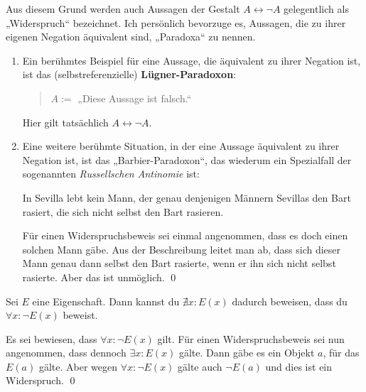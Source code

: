 \begin{bsp}[*] \label{bsp:paradox}
    Aus diesem Grund werden auch Aussagen der Gestalt $A\leftrightarrow \neg A$ gelegentlich als „Widerspruch“ bezeichnet.  Ich persönlich bevorzuge es, Aussagen, die zu ihrer eigenen Negation äquivalent sind, „Paradoxa“ zu nennen.
    \begin{enumerate}
        \item Ein berühmtes Beispiel für eine Aussage, die äquivalent zu ihrer Negation ist, ist das (selbstreferenzielle) \textbf{Lügner-Paradoxon}:
        \begin{quote}
            $A:=$ „Diese Aussage ist falsch.“
        \end{quote}
        Hier gilt tatsächlich $A\leftrightarrow \neg A$.
        \item Eine weitere berühmte Situation, in der eine Aussage äquivalent zu ihrer Negation ist, ist das „Barbier-Paradoxon“, das wiederum ein Spezialfall der sogenannten \emph{Russellschen Antinomie} ist:
        \begin{satz}
            In Sevilla lebt kein Mann, der genau denjenigen Männern Sevillas den Bart rasiert, die sich nicht selbst den Bart rasieren.
        \end{satz}
        \begin{bew}
            Für einen Widerspruchsbeweis sei einmal angenommen, dass es doch einen solchen Mann gäbe. Aus der Beschreibung leitet man ab, dass sich dieser Mann genau dann selbst den Bart rasierte, wenn er ihn sich nicht selbst rasierte. Aber das ist unmöglich. \qed
        \end{bew}
    \end{enumerate}
    
\end{bsp}

  
\begin{satz} \label{existenzwiderleg}
    Sei $E$ eine Eigenschaft. Dann kannst du $\nexists x: E(x)$ dadurch beweisen, dass du $\forall x: \neg E(x)$ beweist.
\end{satz}


\begin{bew}
    Es sei bewiesen, dass $\forall x: \neg E(x)$ gilt. Für einen Widerspruchsbeweis sei nun angenommen, dass dennoch $\exists x: E(x)$ gälte. Dann gäbe es ein Objekt $a$, für das $E(a)$ gälte. Aber wegen $\forall x: \neg E(x)$ gälte auch $\neg E(a)$ und dies ist ein Widerspruch. \qed
\end{bew}


